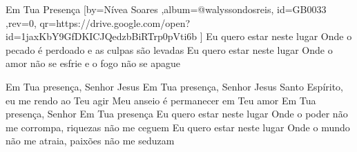 \beginsong
{Em Tua Presença %
}[by={Nívea Soares %
},album={@walyssondosreis},
id={GB0033 %
},rev={0}, %
qr={https://drive.google.com/open?id=1jaxKbY9GfDKICJQedzbBiRTrp0pVti6b %
}]
\beginverse*
Eu quero estar neste lugar
Onde o pecado é perdoado e as culpas são levadas
Eu quero estar neste lugar
Onde o amor não se esfrie e o fogo não se apague
\endverse

\beginverse*
Em Tua presença, Senhor Jesus
Em Tua presença, Senhor Jesus
\endverse
\beginverse*
Santo Espírito, eu me rendo ao Teu agir
Meu anseio é permanecer em Teu amor
\endverse
\beginchorus
Em Tua presença, Senhor
Em Tua presença
\endchorus
\beginverse*
Eu quero estar neste lugar
Onde o poder não me corrompa, riquezas não me ceguem
Eu quero estar neste lugar
Onde o mundo não me atraia, paixões não me seduzam
\endverse

